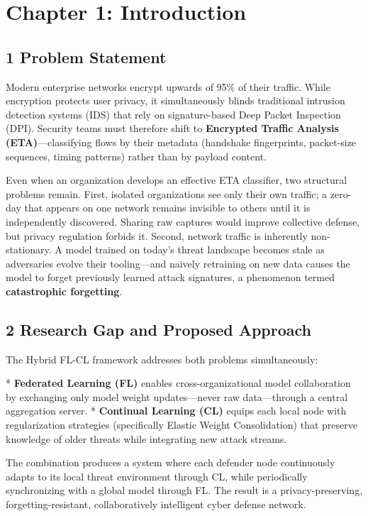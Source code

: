 \documentclass[conference]{IEEEtran}
\begin{document}
\section{Chapter 1: Introduction}


\subsection{1 Problem Statement}

Modern enterprise networks encrypt upwards of 95\% of their traffic. While encryption protects user privacy, it simultaneously blinds traditional intrusion detection systems (IDS) that rely on signature-based Deep Packet Inspection (DPI). Security teams must therefore shift to \textbf{Encrypted Traffic Analysis (ETA)}—classifying flows by their metadata (handshake fingerprints, packet-size sequences, timing patterns) rather than by payload content.

Even when an organization develops an effective ETA classifier, two structural problems remain. First, isolated organizations see only their own traffic; a zero-day that appears on one network remains invisible to others until it is independently discovered. Sharing raw captures would improve collective defense, but privacy regulation forbids it. Second, network traffic is inherently non-stationary. A model trained on today's threat landscape becomes stale as adversaries evolve their tooling—and naively retraining on new data causes the model to forget previously learned attack signatures, a phenomenon termed \textbf{catastrophic forgetting}.


\subsection{2 Research Gap and Proposed Approach}

The Hybrid FL-CL framework addresses both problems simultaneously:

* \textbf{Federated Learning (FL)} enables cross-organizational model collaboration by exchanging only model weight updates—never raw data—through a central aggregation server.
* \textbf{Continual Learning (CL)} equips each local node with regularization strategies (specifically Elastic Weight Consolidation) that preserve knowledge of older threats while integrating new attack streams.

The combination produces a system where each defender node continuously adapts to its local threat environment through CL, while periodically synchronizing with a global model through FL. The result is a privacy-preserving, forgetting-resistant, collaboratively intelligent cyber defense network.
\end{document}
